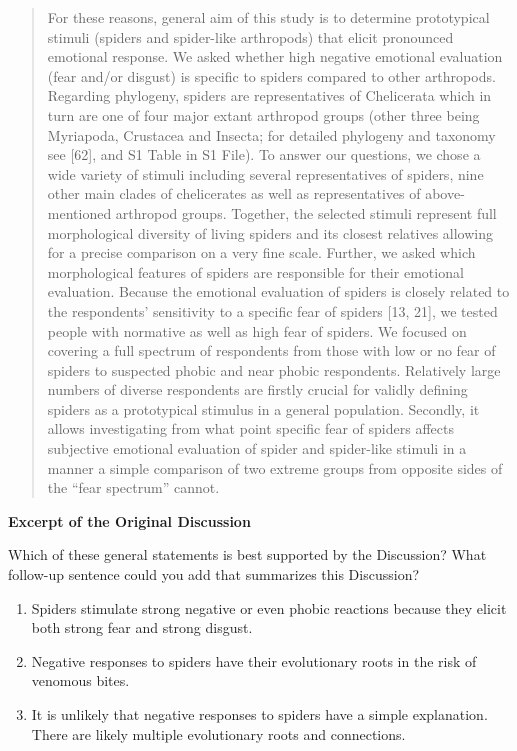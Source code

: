 \documentclass[
]{book}
\providecommand{\tightlist}{%
  \setlength{\itemsep}{0pt}\setlength{\parskip}{0pt}}
\begin{document}
\begin{quote}
For these reasons, general aim of this study is to determine prototypical stimuli (spiders and spider-like arthropods) that elicit pronounced emotional response. We asked whether high negative emotional evaluation (fear and/or disgust) is specific to spiders compared to other arthropods. Regarding phylogeny, spiders are representatives of Chelicerata which in turn are one of four major extant arthropod groups (other three being Myriapoda, Crustacea and Insecta; for detailed phylogeny and taxonomy see {[}62{]}, and S1 Table in S1 File). To answer our questions, we chose a wide variety of stimuli including several representatives of spiders, nine other main clades of chelicerates as well as representatives of above-mentioned arthropod groups. Together, the selected stimuli represent full morphological diversity of living spiders and its closest relatives allowing for a precise comparison on a very fine scale. Further, we asked which morphological features of spiders are responsible for their emotional evaluation. Because the emotional evaluation of spiders is closely related to the respondents' sensitivity to a specific fear of spiders {[}13, 21{]}, we tested people with normative as well as high fear of spiders. We focused on covering a full spectrum of respondents from those with low or no fear of spiders to suspected phobic and near phobic respondents. Relatively large numbers of diverse respondents are firstly crucial for validly defining spiders as a prototypical stimulus in a general population. Secondly, it allows investigating from what point specific fear of spiders affects subjective emotional evaluation of spider and spider-like stimuli in a manner a simple comparison of two extreme groups from opposite sides of the ``fear spectrum'' cannot.
\end{quote}

\textbf{Excerpt of the Original Discussion}

Which of these general statements is best supported by the Discussion? What follow-up sentence could you add that summarizes this Discussion?

\begin{enumerate}
\def\labelenumi{\arabic{enumi}.}
\tightlist
\item
  Spiders stimulate strong negative or even phobic reactions because they elicit both strong fear and strong disgust.
\item
  Negative responses to spiders have their evolutionary roots in the risk of venomous bites.
\item
  It is unlikely that negative responses to spiders have a simple explanation. There are likely multiple evolutionary roots and connections.
\end{enumerate}
\end{document}
